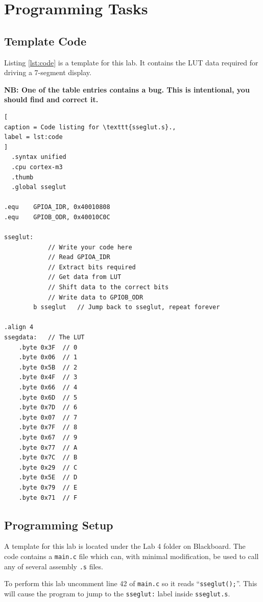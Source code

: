 \documentclass{UoNMCHA}
\numberwithin{equation}{section}
\begin{document}
\pagebreak
\section{Programming Tasks}

\subsection{Template Code}

Listing \ref{lst:code} is a template for this lab. It contains the LUT data required for driving a 7-segment display.

\textbf{NB: One of the table entries contains a bug. This is intentional, you should find and correct it.}

\begin{lstlisting}[
caption = Code listing for \texttt{sseglut.s}.,
label = lst:code
]
  .syntax unified
  .cpu cortex-m3
  .thumb
  .global sseglut

.equ    GPIOA_IDR, 0x40010808
.equ	GPIOB_ODR, 0x40010C0C

sseglut:
            // Write your code here
            // Read GPIOA_IDR
            // Extract bits required
            // Get data from LUT
            // Shift data to the correct bits
            // Write data to GPIOB_ODR
        b sseglut   // Jump back to sseglut, repeat forever
            
.align 4
ssegdata:   // The LUT
    .byte 0x3F  // 0
    .byte 0x06  // 1
    .byte 0x5B  // 2
    .byte 0x4F  // 3
    .byte 0x66  // 4
    .byte 0x6D  // 5
    .byte 0x7D  // 6
    .byte 0x07  // 7
    .byte 0x7F  // 8
    .byte 0x67  // 9
    .byte 0x77  // A
    .byte 0x7C  // B
    .byte 0x29  // C
    .byte 0x5E  // D
    .byte 0x79  // E
    .byte 0x71  // F
\end{lstlisting}

\subsection{Programming Setup}

A template for this lab is located under the Lab 4 folder on Blackboard. The code contains a \texttt{main.c} file which can, with minimal modification, be used to call any of several assembly \texttt{.s} files.

To perform this lab uncomment line 42 of \texttt{main.c} so it reads ``\texttt{sseglut();}''. This will cause the program to jump to the \texttt{sseglut:} label inside \texttt{sseglut.s}.
\end{document}

